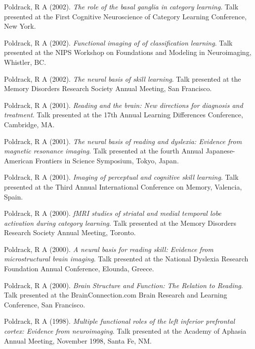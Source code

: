 Poldrack, R A (2002). \emph{ The role of the basal ganglia in category learning}. Talk presented at the First Cognitive Neuroscience of Category Learning Conference, New York. \vspace{2mm} 

Poldrack, R A (2002). \emph{Functional imaging of of classification learning}. Talk presented at the NIPS Workshop on Foundations and Modeling in Neuroimaging, Whistler, BC. \vspace{2mm} 

Poldrack, R A (2002). \emph{The neural basis of skill learning}. Talk presented at the Memory Disorders Research Society Annual Meeting, San Francisco. \vspace{2mm} 

Poldrack, R A (2001). \emph{Reading and the brain: New directions for diagnosis and treatment}. Talk presented at the 17th Annual Learning Differences Conference, Cambridge, MA. \vspace{2mm} 

Poldrack, R A (2001). \emph{The neural basis of reading and dyslexia: Evidence from magnetic resonance imaging}. Talk presented at the fourth Annual Japanese-American Frontiers in Science Symposium, Tokyo, Japan. \vspace{2mm} 

Poldrack, R A (2001). \emph{Imaging of perceptual and cognitive skill learning}. Talk presented at the Third Annual International Conference on Memory, Valencia, Spain. \vspace{2mm} 

Poldrack, R A (2000). \emph{fMRI studies of striatal and medial temporal lobe activation during category learning}. Talk presented at the Memory Disorders Research Society Annual Meeting, Toronto. \vspace{2mm} 

Poldrack, R A (2000). \emph{A neural basis for reading skill: Evidence from microstructural brain imaging}. Talk presented at the National Dyslexia Research Foundation Annual Conference, Elounda, Greece. \vspace{2mm} 

Poldrack, R A (2000). \emph{Brain Structure and Function: The Relation to Reading}. Talk presented at the BrainConnection.com Brain Research and Learning Conference, San Francisco. \vspace{2mm} 

Poldrack, R A (1998). \emph{Multiple functional roles of the left inferior prefrontal cortex: Evidence from neuroimaging}. Talk presented at the Academy of Aphasia Annual Meeting, November 1998, Santa Fe, NM. \vspace{2mm} 

